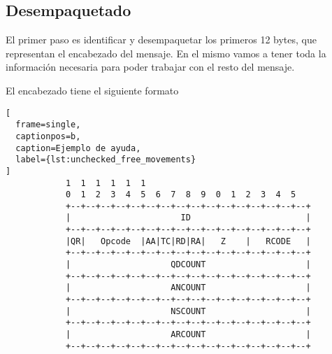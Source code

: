 \documentclass[6pt]{article}
\begin{document}
\subsection{Desempaquetado}

El primer paso es identificar y desempaquetar los primeros
12 bytes, que representan el encabezado del mensaje. En el mismo vamos
a tener toda la información necesaria para poder trabajar con el resto
del mensaje.

El encabezado tiene el siguiente formato

\begin{lstlisting}[
  frame=single,
  captionpos=b,
  caption=Ejemplo de ayuda,
  label={lst:unchecked_free_movements}
]
            1  1  1  1  1  1
            0  1  2  3  4  5  6  7  8  9  0  1  2  3  4  5
            +--+--+--+--+--+--+--+--+--+--+--+--+--+--+--+--+
            |                      ID                       |
            +--+--+--+--+--+--+--+--+--+--+--+--+--+--+--+--+
            |QR|   Opcode  |AA|TC|RD|RA|   Z    |   RCODE   |
            +--+--+--+--+--+--+--+--+--+--+--+--+--+--+--+--+
            |                    QDCOUNT                    |
            +--+--+--+--+--+--+--+--+--+--+--+--+--+--+--+--+
            |                    ANCOUNT                    |
            +--+--+--+--+--+--+--+--+--+--+--+--+--+--+--+--+
            |                    NSCOUNT                    |
            +--+--+--+--+--+--+--+--+--+--+--+--+--+--+--+--+
            |                    ARCOUNT                    |
            +--+--+--+--+--+--+--+--+--+--+--+--+--+--+--+--+
\end{lstlisting}
\end{document}
